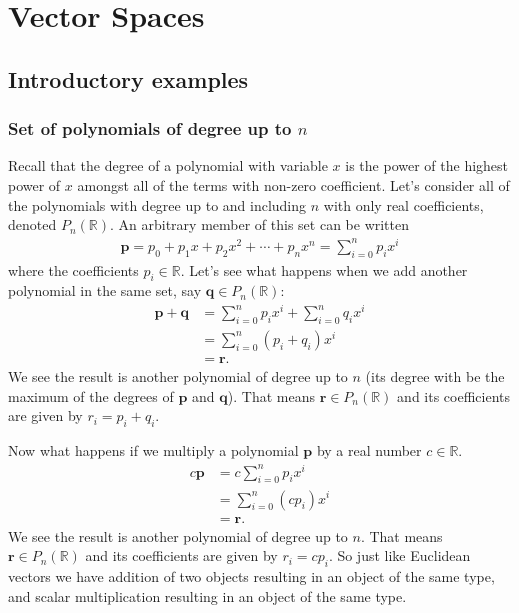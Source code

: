 \chapter{Vector Spaces} \label{ch:vectorspaces}

\section{Introductory examples}

\subsection*{Set of polynomials of degree up to $n$}
Recall that the degree of a polynomial with variable $x$ is the power of the highest power of $x$ amongst all of the terms with non-zero coefficient. Let's consider all of the polynomials with degree up to and including $n$ with only real coefficients, denoted $P_n(\mathbb{R})$. An arbitrary member of this set can be written
\begin{align*}
\mathbf{p} = p_0 + p_1 x + p_2 x^2 + \cdots + p_n x^n = \sum_{i=0}^n p_i x^i
\end{align*}
where the coefficients $p_i \in \mathbb{R}$. Let's see what happens when we add another polynomial in the same set, say $\mathbf{q}\in P_n(\mathbb{R})$:
\begin{align*}
\mathbf{p} + \mathbf{q} &= \sum_{i=0}^n p_i x^i + \sum_{i=0}^n q_i x^i \\
&= \sum_{i=0}^n (p_i+ q_i) x^i \\
&= \mathbf{r}.
\end{align*}
We see the result is another polynomial of degree up to $n$ (its degree with be the maximum of the degrees of $\mathbf{p}$ and $\mathbf{q}$). That means $\mathbf{r}\in P_n(\mathbb{R})$ and its coefficients are given by $r_i = p_i + q_i$. 

Now what happens if we multiply a polynomial $\mathbf{p}$ by a real number $c\in\mathbb{R}$.
\begin{align*}
c\mathbf{p} &= c\sum_{i=0}^n p_i x^i \\
&= \sum_{i=0}^n (c p_i) x^i \\
&= \mathbf{r}.
\end{align*}
We see the result is another polynomial of degree up to $n$. That means $\mathbf{r}\in P_n(\mathbb{R})$ and its coefficients are given by $r_i = c p_i$. So just like Euclidean vectors we have addition of two objects resulting in an object of the same type, and scalar multiplication resulting in an object of the same type.

